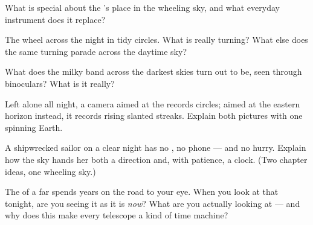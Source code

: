 \begin{exercise}[$\star$]\label{exo:g5:stars-night-sky:6}
What is special about the 's place in the wheeling sky,
and what everyday instrument does it replace?
\end{exercise}

\begin{exercise}[$\star$]\label{exo:g5:stars-night-sky:7}
The  wheel across the night in tidy circles. What is really
turning? What else does the same turning parade across the daytime
sky?
\end{exercise}

\begin{exercise}[$\star$]\label{exo:g5:stars-night-sky:8}
What does the milky band across the darkest skies turn out to be,
seen through binoculars? What is it really?
\end{exercise}

\begin{exercise}[$\star\star$]\label{exo:g5:stars-night-sky:9}
Left alone all night, a camera aimed at the  records
circles; aimed at the eastern horizon instead, it records rising
slanted streaks. Explain both pictures with one spinning Earth.
\end{exercise}

\begin{exercise}[$\star\star$]\label{exo:g5:stars-night-sky:10}
A shipwrecked sailor on a clear night has no , no phone ---
and no hurry. Explain how the sky hands her both a direction and,
with patience, a clock. (Two chapter ideas, one wheeling sky.)
\end{exercise}

\begin{exercise}[$\star\star$]\label{exo:g5:stars-night-sky:11}
The  of a far  spends years on the road to your eye.
When you look at that  tonight, are you seeing it as it is
\emph{now}? What are you actually looking at --- and why does this
make every telescope a kind of time machine?
\end{exercise}
